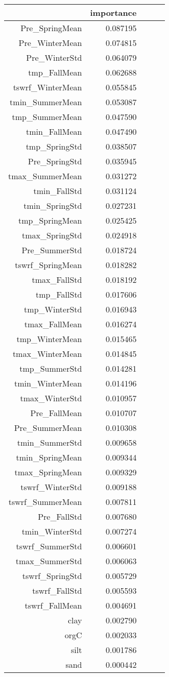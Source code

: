 \begin{tabular}{rrrrr}
\toprule
 & importance \\
\midrule
Pre_SpringMean & 0.087195 \\
Pre_WinterMean & 0.074815 \\
Pre_WinterStd & 0.064079 \\
tmp_FallMean & 0.062688 \\
tswrf_WinterMean & 0.055845 \\
tmin_SummerMean & 0.053087 \\
tmp_SummerMean & 0.047590 \\
tmin_FallMean & 0.047490 \\
tmp_SpringStd & 0.038507 \\
Pre_SpringStd & 0.035945 \\
tmax_SummerMean & 0.031272 \\
tmin_FallStd & 0.031124 \\
tmin_SpringStd & 0.027231 \\
tmp_SpringMean & 0.025425 \\
tmax_SpringStd & 0.024918 \\
Pre_SummerStd & 0.018724 \\
tswrf_SpringMean & 0.018282 \\
tmax_FallStd & 0.018192 \\
tmp_FallStd & 0.017606 \\
tmp_WinterStd & 0.016943 \\
tmax_FallMean & 0.016274 \\
tmp_WinterMean & 0.015465 \\
tmax_WinterMean & 0.014845 \\
tmp_SummerStd & 0.014281 \\
tmin_WinterMean & 0.014196 \\
tmax_WinterStd & 0.010957 \\
Pre_FallMean & 0.010707 \\
Pre_SummerMean & 0.010308 \\
tmin_SummerStd & 0.009658 \\
tmin_SpringMean & 0.009344 \\
tmax_SpringMean & 0.009329 \\
tswrf_WinterStd & 0.009188 \\
tswrf_SummerMean & 0.007811 \\
Pre_FallStd & 0.007680 \\
tmin_WinterStd & 0.007274 \\
tswrf_SummerStd & 0.006601 \\
tmax_SummerStd & 0.006063 \\
tswrf_SpringStd & 0.005729 \\
tswrf_FallStd & 0.005593 \\
tswrf_FallMean & 0.004691 \\
clay & 0.002790 \\
orgC & 0.002033 \\
silt & 0.001786 \\
sand & 0.000442 \\
\bottomrule
\end{tabular}
